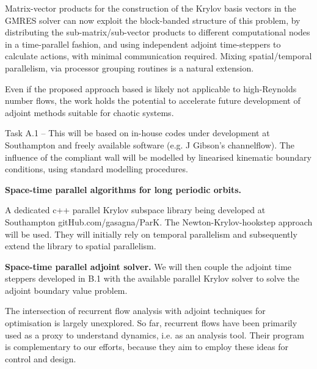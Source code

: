 Matrix-vector products for the construction of the Krylov basis
vectors in the GMRES solver can now exploit the block-banded
structure of this problem, by distributing the
sub-matrix/sub-vector products to different computational nodes in
a time-parallel fashion, and using independent adjoint
time-steppers to calculate actions, with minimal communication
required. Mixing spatial/temporal parallelism, via processor
grouping routines is a natural
extension.

Even if the proposed approach based is likely not applicable to
high-Reynolds number flows, the work holds the potential to accelerate
future development of adjoint methods suitable for chaotic systems. %


Task A.1 – This will be based on in-house codes under development at Southampton and
freely available software (e.g. J Gibson's channelflow). The influence of
the compliant wall will be modelled by linearised kinematic boundary
conditions, using standard modelling procedures. %


{\bf Space-time parallel algorithms for long periodic orbits.}

A dedicated c++ parallel Krylov
subspace library being developed at Southampton
 {gitHub.com/gasagna/ParK}. The
Newton-Krylov-hookstep %
approach will be used. They will
initially rely on temporal parallelism and subsequently extend the
library to spatial parallelism.

{\bf Space-time parallel adjoint solver.}
We will then couple
the adjoint time steppers developed in B.1 with the available
parallel Krylov solver to solve the adjoint boundary value problem.


The intersection of recurrent flow analysis with adjoint
techniques for optimisation is largely unexplored. So far,
recurrent flows have been primarily used as a proxy to understand
dynamics, i.e. as an analysis tool. Their program is
complementary to our efforts, because they aim to employ these
ideas for control and design.

\bigskip

